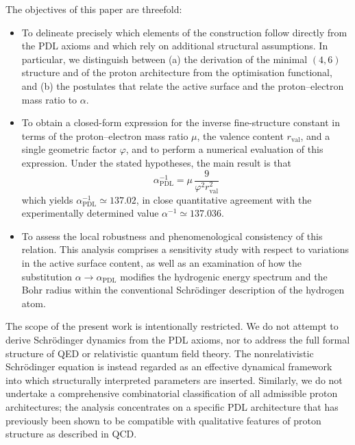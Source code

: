\documentclass[11pt,a4paper]{article}
\theoremstyle{plain}
\theoremstyle{definition}
\theoremstyle{remark}
\begin{document}
The objectives of this paper are threefold:

\begin{itemize}
  \item[(i)] To delineate precisely which elements of the construction follow directly from the PDL axioms and which rely on additional structural assumptions. In particular, we distinguish between (a) the derivation of the minimal \((4,6)\) structure and of the proton architecture from the optimisation functional, and (b) the postulates that relate the active surface and the proton–electron mass ratio to \(\alpha\).

  \item[(ii)] To obtain a closed-form expression for the inverse fine-structure constant in terms of the proton–electron mass ratio \(\mu\), the valence content \(r_{\mathrm{val}}\), and a single geometric factor \(\varphi\), and to perform a numerical evaluation of this expression. Under the stated hypotheses, the main result is that
             \[
               \alpha_{\mathrm{PDL}}^{-1}
               = \mu\,\frac{9}{\varphi^2 r_{\mathrm{val}}^2}
             \]
             which yields \(\alpha_{\mathrm{PDL}}^{-1} \simeq 137.02\), in close quantitative agreement with the experimentally determined value \(\alpha^{-1} \simeq 137.036\).

  \item[(iii)] To assess the local robustness and phenomenological consistency of this relation. This analysis comprises a sensitivity study with respect to variations in the active surface content, as well as an examination of how the substitution \(\alpha \to \alpha_{\mathrm{PDL}}\) modifies the hydrogenic energy spectrum and the Bohr radius within the conventional Schrödinger description of the hydrogen atom.
\end{itemize}

The scope of the present work is intentionally restricted. We do not attempt to derive Schrödinger dynamics from the PDL axioms, nor to address the full formal structure of QED or relativistic quantum field theory. The nonrelativistic Schrödinger equation is instead regarded as an effective dynamical framework into which structurally interpreted parameters are inserted. Similarly, we do not undertake a comprehensive combinatorial classification of all admissible proton architectures; the analysis concentrates on a specific PDL architecture that has previously been shown to be compatible with qualitative features of proton structure as described in QCD.
\end{document}
